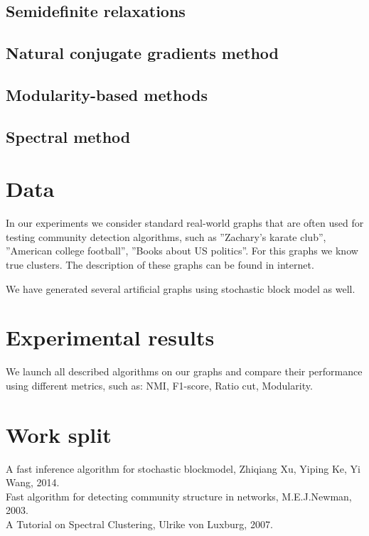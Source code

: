 \documentclass[11pt,a4paper]{extarticle}
\begin{document}
	\subsection{Semidefinite relaxations}
	\subsection{Natural conjugate gradients method}
		
	\subsection{Modularity-based methods}
		
	\subsection{Spectral method}
		
		
\section{Data}

	In our experiments we consider standard real-world graphs that are often used for testing community detection algorithms, such as ''Zachary's karate club'', ''American college football'', ''Books about US politics''. For this graphs we know true clusters. The description of these graphs can be found in internet.

	We have generated several artificial graphs using stochastic block model as well.

\section{Experimental results}
	We launch all described algorithms on our graphs and compare their performance using different metrics, such as: NMI, F1-score, Ratio cut, Modularity.


\section{Work split}


\renewcommand{\refname}{References}
\begin{thebibliography}{9}
    A fast inference algorithm for stochastic blockmodel, Zhiqiang Xu, Yiping Ke, Yi Wang, 2014. \\
    Fast algorithm for detecting community structure in networks, M.E.J.Newman, 2003.\\
    A Tutorial on Spectral Clustering, Ulrike von Luxburg, 2007.\\
\end{thebibliography}
\end{document}
